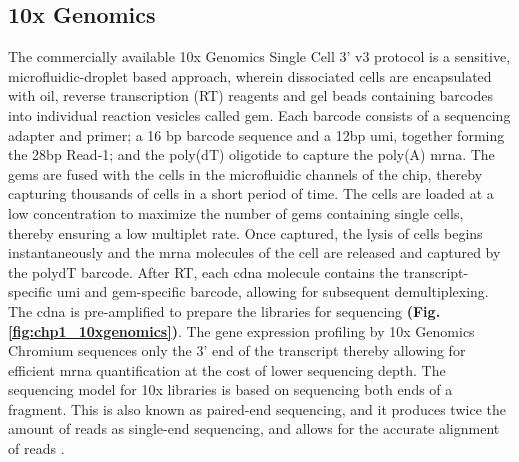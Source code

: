 \subsection{10x Genomics}
\label{sec:scrna_10x}
\par The commercially available 10x Genomics Single Cell 3’ v3 protocol is a sensitive, microfluidic-droplet based approach, wherein dissociated cells are encapsulated with oil, reverse transcription (RT) reagents and gel beads containing barcodes into individual reaction vesicles called \gls{gem}. Each barcode consists of a sequencing adapter and primer; a 16 \gls{bp}  barcode sequence and a 12\gls{bp} \gls{umi}, together forming the 28\gls{bp} Read-1; and the poly(dT) oligotide to capture the poly(A) \gls{mrna}. The \gls{gem}s are fused with the cells in the microfluidic channels of the chip, thereby capturing thousands of cells in a short period of time. The cells are loaded at a low concentration to maximize the number of \gls{gem}s containing single cells, thereby ensuring a low multiplet rate. Once captured, the lysis of cells begins instantaneously and the \gls{mrna} molecules of the cell are released and captured by the polydT barcode. After RT, each \gls{cdna} molecule contains the transcript-specific \gls{umi} and \gls{gem}-specific barcode, allowing for subsequent demultiplexing. The \gls{cdna} is pre-amplified to prepare the libraries for sequencing \textbf{(Fig. \ref{fig:chp1_10xgenomics})}. The gene expression profiling by 10x Genomics Chromium sequences only the 3’ end of the transcript thereby allowing for efficient \gls{mrna} quantification at the cost of lower sequencing depth. The sequencing model for 10x libraries is based on sequencing both ends of a fragment. This is also known as paired-end sequencing, and it produces twice the amount of reads as single-end sequencing, and allows for the accurate alignment of reads \textbf{\cite{danielski_guidance_2023, noauthor_paired-end_nodate}}.

